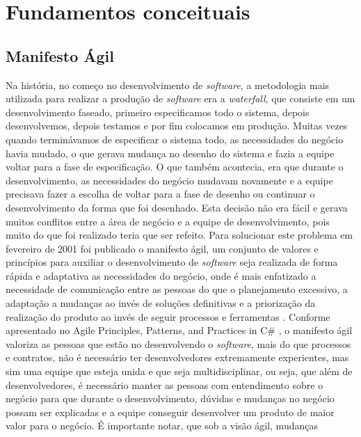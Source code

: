 \part{Fundamentos conceituais}
  \chapter{Manifesto Ágil}
    Na história, no começo no desenvolvimento de \textit{software}, a metodologia
    mais utilizada para realizar a produção de \textit{software} era a \textit{waterfall},
    que consiste em um desenvolvimento faseado, primeiro especificamos todo o sistema,
    depois desenvolvemos, depois testamos e por fim colocamos em produção.
    Muitas vezes quando terminávamos de especificar o sistema todo, as necessidades
    do negócio havia mudado, o que gerava mudança no desenho do sistema e fazia
    a equipe voltar para a fase de especificação. O que também acontecia, era que
    durante o desenvolvimento, as necessidades do negócio mudavam novamente e
    a equipe precisava fazer a escolha de voltar para a fase de desenho ou continuar
    o desenvolvimento da forma que foi desenhado. Esta decisão não era fácil e
    gerava muitos conflitos entre a área de negócio e a equipe de desenvolvimento,
    pois muito do que foi realizado teria que ser refeito. \newline
    Para solucionar este problema em fevereiro de 2001 foi publicado o manifesto
    ágil, um conjunto de valores e princípios para auxiliar o desenvolvimento de
    \textit{software} seja realizada de forma rápida e adaptativa as
    necessidades do negócio, onde é mais enfatizado a necessidade de comunicação
    entre as pessoas do que o planejamento excessivo, a adaptação a mudanças ao
    invés de soluções definitivas e a priorização da realização do produto ao
    invés de seguir processos e ferramentas \cite{manifestoAgile}. \newline
    Conforme apresentado no Agile Principles, Patterns, and Practices in C\#
    \cite{martin2007agile}, o manifesto ágil valoriza as pessoas que estão
    no desenvolvendo o \textit{software}, mais do que processos e contratos,
    não é necessário ter desenvolvedores extremamente experientes, mas sim
    uma equipe que esteja unida e que seja multidisciplinar, ou seja, que além de
    desenvolvedores, é necessário manter as pessoas com entendimento sobre o
    negócio para que durante o desenvolvimento, dúvidas e mudanças no negócio
    possam ser explicadas e a equipe conseguir desenvolver um produto de maior
    valor para o negócio. É importante notar, que sob a visão ágil, mudanças
